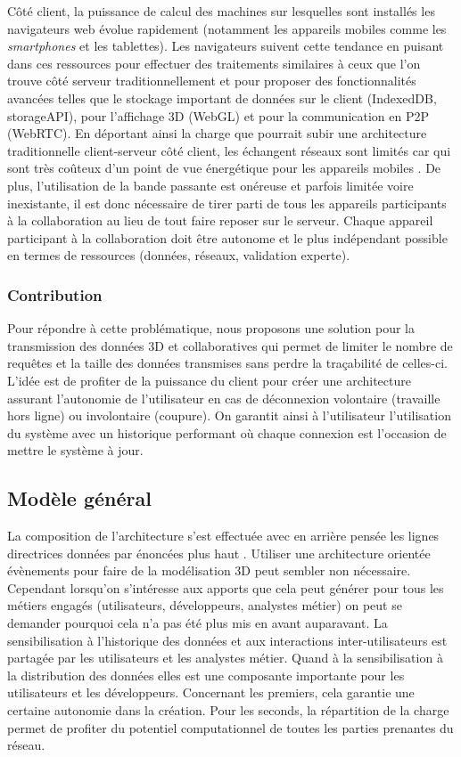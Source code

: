 Côté client, la puissance de calcul des machines sur lesquelles sont installés les 
navigateurs web évolue rapidement (notamment les appareils mobiles comme les 
\textit{smartphones} et les tablettes). Les navigateurs suivent cette tendance en 
puisant dans ces ressources pour effectuer des traitements similaires à ceux que 
l'on trouve côté serveur traditionnellement et pour proposer des fonctionnalités 
avancées telles que le stockage important de données sur le client (IndexedDB, 
storageAPI), pour l'affichage 3D (WebGL) et pour la communication en \gls{P2P} 
(\gls{WebRTC}). En déportant ainsi la charge que pourrait subir une architecture 
traditionnelle client-serveur côté client, les échangent réseaux sont limités car qui 
sont très coûteux d'un point de vue énergétique pour les appareils mobiles 
\cite{Koskela2015}. De plus, l'utilisation de la bande passante est onéreuse et 
parfois limitée voire inexistante, il est donc nécessaire de tirer parti de tous les 
appareils participants à la collaboration au lieu de tout faire reposer sur le serveur. 
Chaque appareil participant à la collaboration doit être autonome et le plus 
indépendant possible en termes de ressources (données, réseaux, validation 
experte). 


\subsubsection{Contribution}
Pour répondre à cette problématique, nous proposons une solution pour la 
transmission des données 3D et collaboratives qui permet de  limiter  le nombre 
de requêtes et la taille des données transmises sans perdre la traçabilité de 
celles-ci. L'idée est de profiter de la puissance du client pour créer une 
architecture assurant l'autonomie de l'utilisateur en cas de déconnexion volontaire 
(travaille hors ligne) ou involontaire (coupure). On garantit ainsi à l'utilisateur 
l'utilisation du système avec un historique performant où chaque connexion est 
l'occasion de mettre le système à jour.


\subsection{Modèle général}
La composition de l'architecture s'est effectuée avec en arrière pensée les lignes 
directrices données par  énoncées plus haut \cite{Xhafa2010}. 
Utiliser une architecture orientée évènements pour faire de la modélisation 3D peut 
sembler non nécessaire. Cependant lorsqu'on s'intéresse aux apports que cela 
peut générer pour tous les métiers engagés (utilisateurs, développeurs, analystes 
métier) on peut se demander pourquoi cela n'a pas été plus mis en avant 
auparavant. La sensibilisation à l'historique des données et aux interactions 
inter-utilisateurs est partagée  par les utilisateurs et les analystes métier. Quand à 
la sensibilisation à la distribution des données elles est une composante 
importante pour les utilisateurs et les développeurs. Concernant les premiers, cela 
garantie une certaine autonomie dans la création. Pour les seconds, la répartition 
de la charge permet de profiter du potentiel computationnel de toutes les parties 
prenantes du réseau. 

